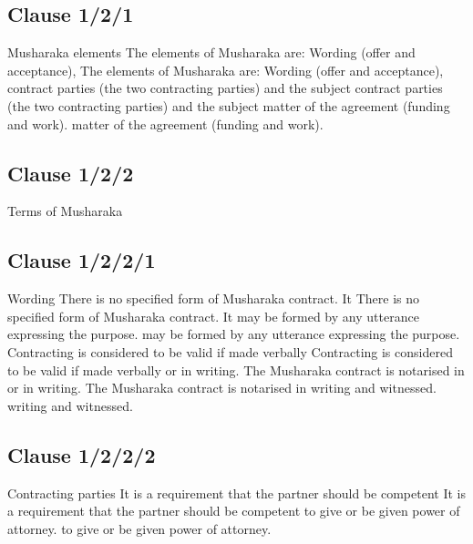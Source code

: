 \documentclass{article}%
\begin{document}
%
\subsection{Clause 1/2/1}%
\label{subsec:Clause1/2/1}%
Musharaka elements   The elements of Musharaka are: Wording (offer and acceptance),    The elements of Musharaka are: Wording (offer and acceptance),  contract parties (the two contracting parties) and the subject  contract parties (the two contracting parties) and the subject  matter of the agreement (funding and work). matter of the agreement (funding and work).

%
\subsection{Clause 1/2/2}%
\label{subsec:Clause1/2/2}%
Terms of Musharaka

%
\subsection{Clause 1/2/2/1}%
\label{subsec:Clause1/2/2/1}%
Wording   There is no specified form of Musharaka contract. It    There is no specified form of Musharaka contract. It  may be formed by any utterance expressing the purpose.  may be formed by any utterance expressing the purpose.  Contracting is considered to be valid if made verbally  Contracting is considered to be valid if made verbally  or in writing. The Musharaka contract is notarised in  or in writing. The Musharaka contract is notarised in  writing and witnessed. writing and witnessed.

%
\subsection{Clause 1/2/2/2}%
\label{subsec:Clause1/2/2/2}%
Contracting parties   It is a requirement that the partner should be competent    It is a requirement that the partner should be competent  to give or be given power of attorney. to give or be given power of attorney.

%
\end{document}
